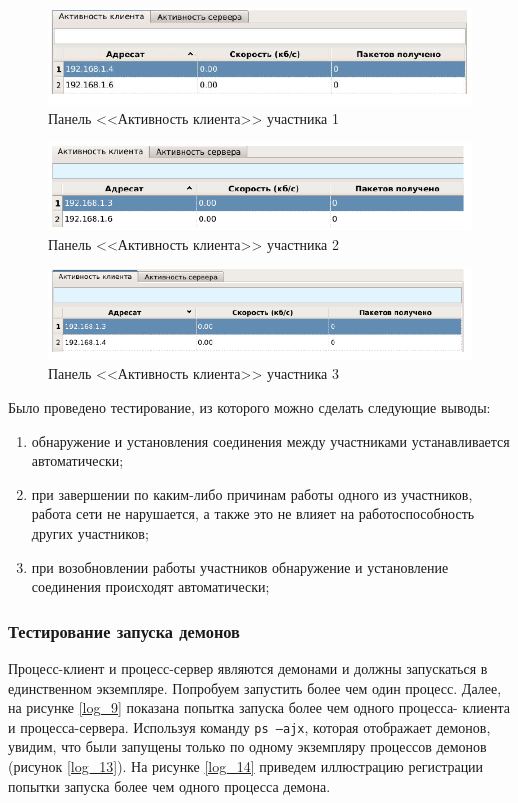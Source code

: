 \begin{figure}[!hbt]
    \centering
    \includegraphics[width=\textwidth]{log_10}
    \caption{Панель <<Активность клиента>> участника 1}\label{log_10}
\end{figure}
\begin{figure}[!hbt]
    \centering
    \includegraphics[width=\textwidth]{log_11}
    \caption{Панель <<Активность клиента>> участника 2}\label{log_11}
\end{figure}
\begin{figure}[!hbt]
    \centering
    \includegraphics[width=\textwidth]{log_12}
    \caption{Панель <<Активность клиента>> участника 3}\label{log_12}
\end{figure}
\newpar
Было проведено тестирование, из которого можно сделать следующие
выводы:
\begin{enumerate}
    \item обнаружение и установления соединения между участниками
        устанавливается автоматически;
    \item при завершении по каким-либо причинам работы одного из участников,
        работа сети не нарушается, а также это не влияет на работоспособность
        других участников;
    \item при возобновлении работы участников обнаружение и установление
        соединения происходят автоматически;
\end{enumerate}

\subsubsection*{Тестирование запуска демонов}
Процесс-клиент и процесс-сервер являются демонами и должны запускаться
в единственном экземпляре. Попробуем запустить более чем один процесс.
Далее, на рисунке \ref{log_9} показана попытка запуска более чем одного процесса-
клиента и процесса-сервера. Используя команду \texttt{ps –ajx}, которая отображает
демонов, увидим, что были запущены только по одному экземпляру
процессов демонов (рисунок \ref{log_13}). На рисунке \ref{log_14} приведем иллюстрацию
регистрации попытки запуска более чем одного процесса демона.

